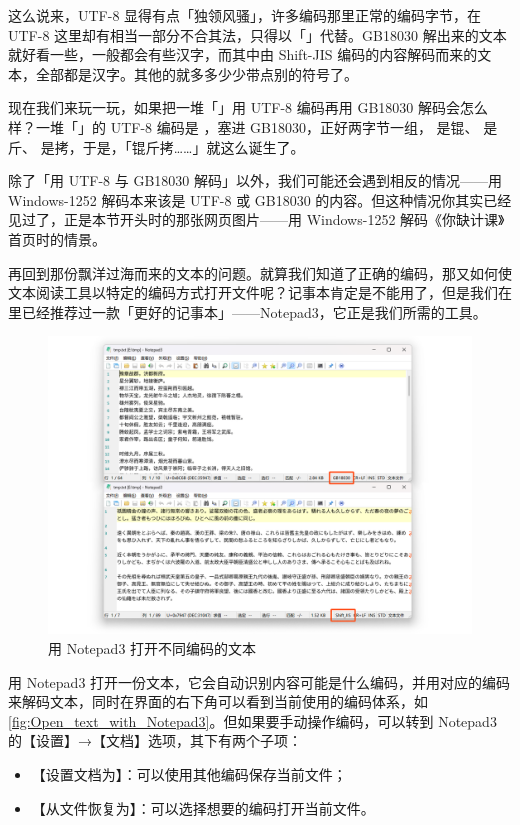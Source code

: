 这么说来，UTF-8 显得有点「独领风骚」，许多编码那里正常的编码字节，在 UTF-8 这里却有相当一部分不合其法，只得以「\replacesymb{}」代替。GB18030 解出来的文本就好看一些，一般都会有些汉字，而其中由 Shift-JIS 编码的内容解码而来的文本，全部都是汉字。其他的就多多少少带点别的符号了。

现在我们来玩一玩，如果把一堆「\replacesymb{}」用 UTF-8 编码再用 GB18030 解码会怎么样？一堆「\replacesymb{}」的 UTF-8 编码是 ，塞进 GB18030，正好两字节一组， 是锟、 是斤、 是拷，于是，「锟斤拷……」就这么诞生了。

除了「用 UTF-8 与 GB18030 解码」以外，我们可能还会遇到相反的情况——用 Windows-1252 解码本来该是 UTF-8 或 GB18030 的内容。但这种情况你其实已经见过了，正是本节开头时的那张网页图片——用 Windows-1252 解码《你缺计课》首页时的情景。

再回到那份飘洋过海而来的文本的问题。就算我们知道了正确的编码，那又如何使文本阅读工具以特定的编码方式打开文件呢？记事本肯定是不能用了，但是我们在里已经推荐过一款「更好的记事本」——Notepad3，它正是我们所需的工具。

\begin{figure}[htb!]
  \centering
  \includegraphics[width=.7\textwidth]{assets/advanced/Notepad3.png}
  \caption{用 Notepad3 打开不同编码的文本}
  \label{fig:Open_text_with_Notepad3}
\end{figure}

用 Notepad3 打开一份文本，它会自动识别内容可能是什么编码，并用对应的编码来解码文本，同时在界面的右下角可以看到当前使用的编码体系，如\autoref{fig:Open_text_with_Notepad3}。但如果要手动操作编码，可以转到 Notepad3 的【设置】→【文档】选项，其下有两个子项：

\begin{itemize}
  \item 【设置文档为】：可以使用其他编码保存当前文件；
  \item 【从文件恢复为】：可以选择想要的编码打开当前文件。
\end{itemize}

